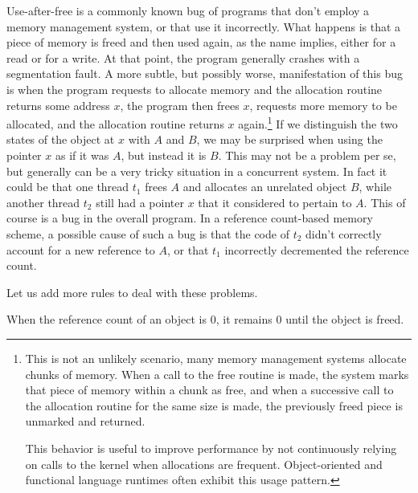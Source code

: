 Use-after-free is a commonly known bug of programs that don't employ a memory management system, or that use it incorrectly.
What happens is that a piece of memory is freed and then used again, as the name implies, either for a read or for a write.
At that point, the program generally crashes with a segmentation fault.
A more subtle, but possibly worse, manifestation of this bug is when the program requests to allocate memory and the allocation routine returns some address $x$, the program then frees $x$, requests more memory to be allocated, and the allocation routine returns $x$ again.\footnote{%
	This is not an unlikely scenario, many memory management systems allocate chunks of memory.
	When a call to the free routine is made, the system marks that piece of memory within a chunk as free, and when a successive call to the allocation routine for the same size is made, the previously freed piece is unmarked and returned.
	
	This behavior is useful to improve performance by not continuously relying on calls to the kernel when allocations are frequent.
	Object-oriented and functional language runtimes often exhibit this usage pattern.
}
If we distinguish the two states of the object at $x$ with $A$ and $B$, we may be surprised when using the pointer $x$ as if it was $A$, but instead it is $B$.
This may not be a problem per se, but generally can be a very tricky situation in a concurrent system.
In fact it could be that one thread $t_1$ frees $A$ and allocates an unrelated object $B$, while another thread $t_2$ still had a pointer $x$ that it considered to pertain to $A$.
This of course is a bug in the overall program.
In a reference count-based memory scheme, a possible cause of such a bug is that the code of $t_2$ didn't correctly account for a new reference to $A$, or that $t_1$ incorrectly decremented the reference count.

Let us add more rules to deal with these problems.



\begin{myrule}\label{refcount:0-stays-0}
	When the reference count of an object is 0, it remains 0 until the object is freed.
\end{myrule}

